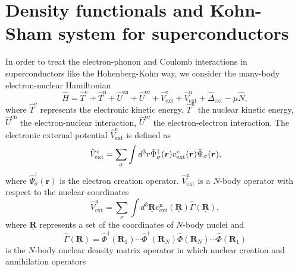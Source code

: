 \section{Density functionals and Kohn-Sham system for superconductors}
In order to treat the electron-phonon and Coulomb interactions in superconductors like the Hohenberg-Kohn way, 
we consider the many-body electron-nuclear Hamiltonian
%
\begin{equation}  %
\label{eq:Hamil}
   \hat{H} = \hat{T}^\mathrm{e} + \hat{T}^\mathrm{n} + \hat{U}^\mathrm{en} + \hat{U}^\mathrm{ee}
                   + \hat{V}^\mathrm{e}_\mathrm{ext} + \hat{V}^\mathrm{n}_\mathrm{ext}
                   + \hat{\Delta}_\mathrm{ext} - \mu\hat{N},
\end{equation} 
%
where $\hat{T}^\mathrm{e}$ represents the electronic kinetic energy, $\hat{T}^\mathrm{n}$ the nuclear kinetic energy, 
$\hat{U}^\mathrm{en}$ the electron-nuclear interaction, $\hat{U}^\mathrm{ee}$ the electron-electron interaction.
The electronic external potential $\hat{V}^\mathrm{e}_\mathrm{ext}$ is defined as
%
\begin{equation} %
	\hat{V}^\mathrm{e}_\mathrm{ext} = \sum_{\sigma}\int d^3r\hat{\Psi}^\dag_{\sigma}({\bm r})
	                                                            v^\mathrm{e}_{\rm ext}(\bm{r})\hat{\Psi}_{\sigma}(\bm{r}), 
\end{equation} 
%
where $\hat{\Psi}^\dag_{\sigma}({\bm r})$ is the electron creation operator. 
$\hat{V}^\mathrm{n}_\mathrm{ext}$  is a $N$-body operator with respect to the nuclear coordinates
%
\begin{equation} %
	\hat{V}^\mathrm{n}_\mathrm{ext} = \sum_{\sigma}\int d^3\underline{\bm{R}}
	                                                            v^\mathrm{n}_\mathrm{ext}(\underline{\bm{R}})
	                                                            \hat{\Gamma}(\underline{\bm{R}}),
\end{equation} 
%
where $\underline{\bm{R}}$ represents a set of the coordinates of $N$-body nuclei and 
%
\begin{equation} %
	\hat{\Gamma}(\underline{\bm{R}}) = \hat{\Phi}^\dag \left(\bm{R}_1 \right) \cdots \hat{\Phi}^\dag \left(\bm{R}_N \right)
	                                                          \hat{\Phi} \left(\bm{R}_N \right) \cdots \hat{\Phi} \left(\bm{R}_1 \right)
\end{equation} 
%
is the $N$-body nuclear density matrix operator in which nuclear creation and annihilation operators 
